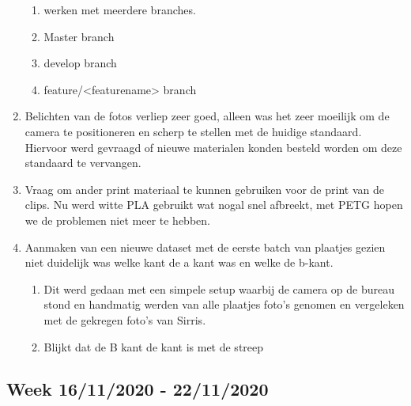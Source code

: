 \documentclass{article}
\begin{document}
\begin{enumerate}[1]
	\begin{enumerate}[a]
	\item werken met meerdere branches. 
	\item Master branch 
	\item develop branch
	\item feature/\textless{}featurename\textgreater{} branch
	\end{enumerate}
\item Belichten van de fotos verliep zeer goed, alleen was het zeer moeilijk om de camera te positioneren en scherp te stellen met de huidige standaard. Hiervoor werd gevraagd of nieuwe materialen konden besteld worden om deze standaard te vervangen.
\item Vraag om ander print materiaal te kunnen gebruiken voor de print van de clips. Nu werd witte PLA gebruikt wat nogal snel afbreekt, met PETG hopen we de problemen niet meer te hebben.
\item Aanmaken van een nieuwe dataset met de eerste batch van plaatjes gezien niet duidelijk was welke kant de a kant was en welke de b-kant.
	\begin{enumerate}[a]
	\item Dit werd gedaan met een simpele setup waarbij de camera op de bureau stond en handmatig werden van alle plaatjes foto's genomen en vergeleken met de gekregen foto's van Sirris.
	\item Blijkt dat de B kant de kant is met de streep
	\end{enumerate}
\end{enumerate}


\subsection{Week 16/11/2020 - 22/11/2020}
\end{document}
